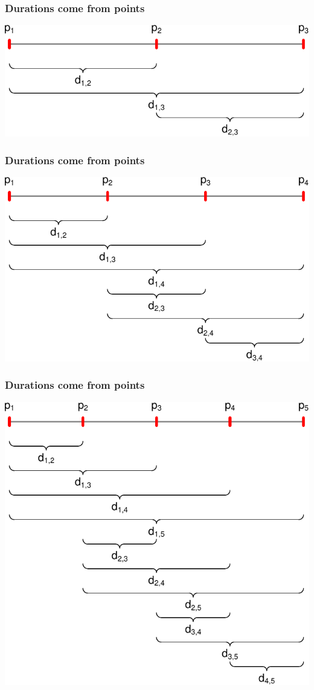 \documentclass[20pt]{beamer}
\begin{document}
\begin{frame}
\frametitle{Durations come from points}
\centering
\includegraphics[scale=1.5]{Figures/linep3.pdf}\\
\end{frame}

\begin{frame}
\frametitle{Durations come from points}
\centering
\includegraphics[scale=1.5]{Figures/linep4.pdf}\\
\end{frame}

\begin{frame}
\frametitle{Durations come from points}
\centering
\includegraphics[scale=1.5]{Figures/linep5.pdf}\\
\end{frame}
\end{document}
